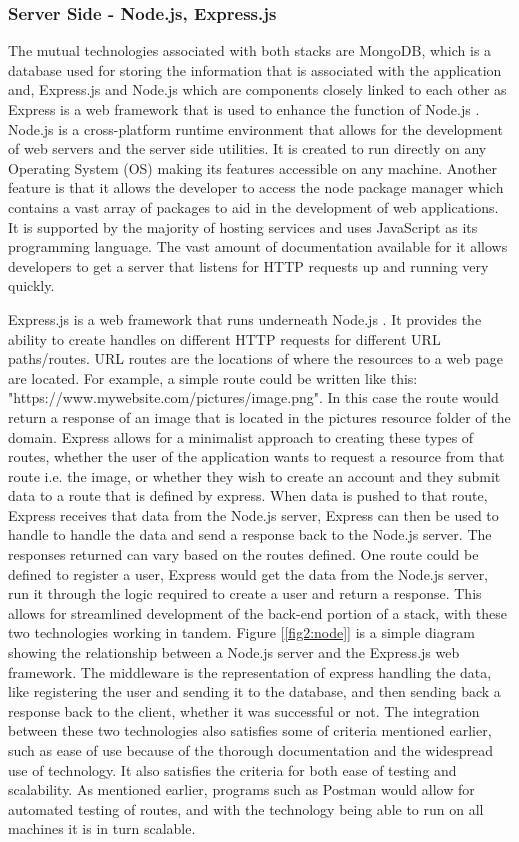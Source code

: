\subsubsection{Server Side - Node.js, Express.js}
The mutual technologies associated with both stacks are MongoDB, which is a database used for storing the information that is associated with the application and, Express.js and Node.js which are components closely linked to each other as Express is a web framework that is used to enhance the function of Node.js \cite{mozillaNode}. Node.js is a cross-platform runtime environment that allows for the development of web servers and the server side utilities. It is created to run directly on any Operating System (OS) making its features accessible on any machine. Another feature is that it allows the developer to access the node package manager which contains a vast array of packages to aid in the development of web applications. It is supported by the majority of hosting services and uses JavaScript as its programming language. The vast amount of documentation available for it allows developers to get a server that listens for HTTP requests up and running very quickly.

Express.js is a web framework that runs underneath Node.js \cite{express}. It provides the ability to create handles on different HTTP requests for different URL paths/routes. URL routes are the locations of where the resources to a web page are located. For example, a simple route could be written like this: "https://www.mywebsite.com/pictures/image.png". In this case the route would return a response of an image that is located in the pictures resource folder of the domain. Express allows for a minimalist approach to creating these types of routes, whether the user of the application wants to request a resource from that route i.e. the image, or whether they wish to create an account and they submit data to a route that is defined by express. When data is pushed to that route, Express receives that data from the Node.js server, Express can then be used to handle to handle the data and send a response back to the Node.js server. The responses returned can vary based on the routes defined. One route could be defined to register a user, Express would get the data from the Node.js server, run it through the logic required to create a user and return a response. This allows for streamlined development of the back-end portion of a stack, with these two technologies working in tandem. Figure [\ref{fig2:node}] is a simple diagram showing the relationship between a Node.js server and the Express.js web framework. The middleware is the representation of express handling the data, like registering the user and sending it to the database, and then sending back a response back to the client, whether it was successful or not. The integration between these two technologies also satisfies some of criteria mentioned earlier, such as ease of use because of the thorough documentation and the widespread use of technology. It also satisfies the criteria for both ease of testing and scalability. As mentioned earlier, programs such as Postman would allow for automated testing of routes, and with the technology being able to run on all machines it is in turn scalable.

